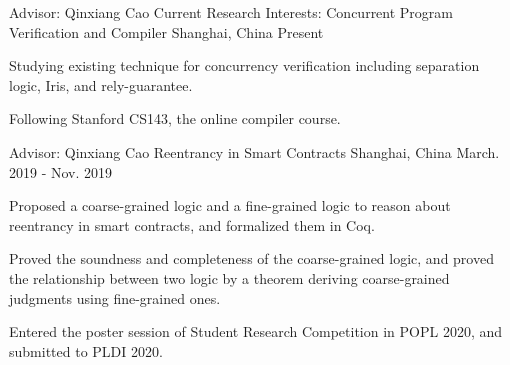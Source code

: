 

\begin{cventries}

  \cventry
    {Advisor: Qinxiang Cao}
    {Current Research Interests: Concurrent Program Verification and Compiler}
    {Shanghai, China}
    {Present}
    {
      \begin{cvitems}
        \item {Studying existing technique for concurrency verification including separation logic, Iris, and rely-guarantee.}
        \item {Following Stanford CS143, the online compiler course.}
      \end{cvitems}
    }

  \cventry
    {Advisor: Qinxiang Cao} %
    {Reentrancy in Smart Contracts} %
    {Shanghai, China} %
    {March. 2019 - Nov. 2019} %
    {
      \begin{cvitems} %
        \item {Proposed a coarse-grained logic and a fine-grained logic to reason about reentrancy in smart contracts, and formalized them in Coq.}
        \item {Proved the soundness and completeness of the coarse-grained logic, and proved the relationship between two logic by a theorem deriving coarse-grained judgments using fine-grained ones.}
        \item {Entered the poster session of Student Research Competition in POPL 2020, and submitted to PLDI 2020.}
      \end{cvitems}
    }

\end{cventries}
